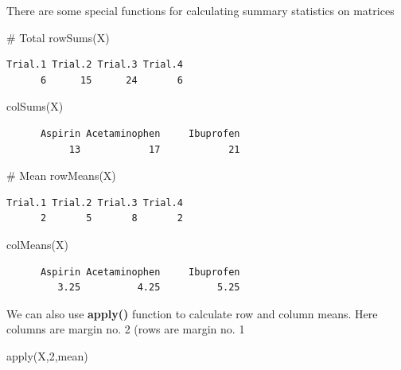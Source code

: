 \documentclass[
  letterpaper,
  DIV=11,
  numbers=noendperiod]{scrreprt}
\newenvironment{Shaded}{\begin{snugshade}}{\end{snugshade}}
\newcommand{\CommentTok}[1]{\textcolor[rgb]{0.37,0.37,0.37}{#1}}
\newcommand{\DecValTok}[1]{\textcolor[rgb]{0.68,0.00,0.00}{#1}}
\newcommand{\FunctionTok}[1]{\textcolor[rgb]{0.28,0.35,0.67}{#1}}
\newcommand{\NormalTok}[1]{\textcolor[rgb]{0.00,0.23,0.31}{#1}}
\begin{document}
There are some special functions for calculating summary statistics on
matrices

\begin{Shaded}
\begin{Highlighting}[]
\CommentTok{\# Total}
\FunctionTok{rowSums}\NormalTok{(X)}
\end{Highlighting}
\end{Shaded}

\begin{verbatim}
Trial.1 Trial.2 Trial.3 Trial.4 
      6      15      24       6 
\end{verbatim}

\begin{Shaded}
\begin{Highlighting}[]
\FunctionTok{colSums}\NormalTok{(X)}
\end{Highlighting}
\end{Shaded}

\begin{verbatim}
      Aspirin Acetaminophen     Ibuprofen 
           13            17            21 
\end{verbatim}

\begin{Shaded}
\begin{Highlighting}[]
\CommentTok{\# Mean}
\FunctionTok{rowMeans}\NormalTok{(X)}
\end{Highlighting}
\end{Shaded}

\begin{verbatim}
Trial.1 Trial.2 Trial.3 Trial.4 
      2       5       8       2 
\end{verbatim}

\begin{Shaded}
\begin{Highlighting}[]
\FunctionTok{colMeans}\NormalTok{(X)}
\end{Highlighting}
\end{Shaded}

\begin{verbatim}
      Aspirin Acetaminophen     Ibuprofen 
         3.25          4.25          5.25 
\end{verbatim}

We can also use \textbf{apply()} function to calculate row and column
means. Here columns are margin no. 2 (rows are margin no. 1

\begin{Shaded}
\begin{Highlighting}[]
\FunctionTok{apply}\NormalTok{(X,}\DecValTok{2}\NormalTok{,mean)}
\end{Highlighting}
\end{Shaded}
\end{document}
